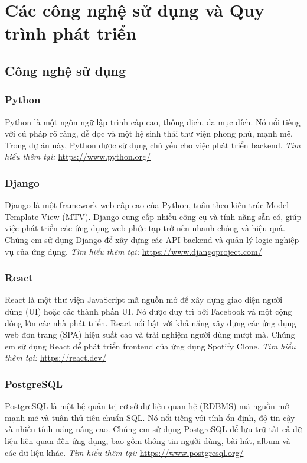 \chapter{Các công nghệ sử dụng và Quy trình phát triển}
\label{ch:tech_stack}

\section{Công nghệ sử dụng}
\label{sec:tech_used}

\subsection{Python}
Python là một ngôn ngữ lập trình cấp cao, thông dịch, đa mục đích. Nó nổi tiếng với cú pháp rõ ràng, dễ đọc và một hệ sinh thái thư viện phong phú, mạnh mẽ. Trong dự án này, Python được sử dụng chủ yếu cho việc phát triển backend.
\textit{Tìm hiểu thêm tại:} \url{https://www.python.org/}

\subsection{Django}
Django là một framework web cấp cao của Python, tuân theo kiến trúc Model-Template-View (MTV). Django cung cấp nhiều công cụ và tính năng sẵn có, giúp việc phát triển các ứng dụng web phức tạp trở nên nhanh chóng và hiệu quả. Chúng em sử dụng Django để xây dựng các API backend và quản lý logic nghiệp vụ của ứng dụng.
\textit{Tìm hiểu thêm tại:} \url{https://www.djangoproject.com/}

\subsection{React}
React là một thư viện JavaScript mã nguồn mở để xây dựng giao diện người dùng (UI) hoặc các thành phần UI. Nó được duy trì bởi Facebook và một cộng đồng lớn các nhà phát triển. React nổi bật với khả năng xây dựng các ứng dụng web đơn trang (SPA) hiệu suất cao và trải nghiệm người dùng mượt mà. Chúng em sử dụng React để phát triển frontend của ứng dụng Spotify Clone.
\textit{Tìm hiểu thêm tại:} \url{https://react.dev/}

\subsection{PostgreSQL}
PostgreSQL là một hệ quản trị cơ sở dữ liệu quan hệ (RDBMS) mã nguồn mở mạnh mẽ và tuân thủ tiêu chuẩn SQL. Nó nổi tiếng với tính ổn định, độ tin cậy và nhiều tính năng nâng cao. Chúng em sử dụng PostgreSQL để lưu trữ tất cả dữ liệu liên quan đến ứng dụng, bao gồm thông tin người dùng, bài hát, album và các dữ liệu khác.
\textit{Tìm hiểu thêm tại:} \url{https://www.postgresql.org/}

